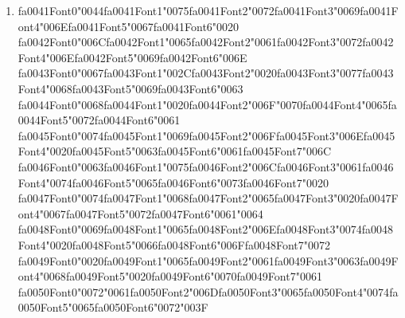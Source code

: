 \documentclass[11pt]{article}
\begin{document}
\begin{enumerate}[label=Q\arabic*., leftmargin=*]
\item {\csname fa0041Font0\endcsname\char"0044}{\csname fa0041Font1\endcsname\char"0075}{\csname fa0041Font2\endcsname\char"0072}{\csname fa0041Font3\endcsname\char"0069}{\csname fa0041Font4\endcsname\char"006E}{\csname fa0041Font5\endcsname\char"0067}{\csname fa0041Font6\endcsname\char"0020} {\csname fa0042Font0\endcsname\char"006C}{\csname fa0042Font1\endcsname\char"0065}{\csname fa0042Font2\endcsname\char"0061}{\csname fa0042Font3\endcsname\char"0072}{\csname fa0042Font4\endcsname\char"006E}{\csname fa0042Font5\endcsname\char"0069}{\csname fa0042Font6\endcsname\char"006E} {\csname fa0043Font0\endcsname\char"0067}{\csname fa0043Font1\endcsname\char"002C}{\csname fa0043Font2\endcsname\char"0020}{\csname fa0043Font3\endcsname\char"0077}{\csname fa0043Font4\endcsname\char"0068}{\csname fa0043Font5\endcsname\char"0069}{\csname fa0043Font6\endcsname\char"0063} {\csname fa0044Font0\endcsname\char"0068}{\csname fa0044Font1\endcsname\char"0020}{\csname fa0044Font2\endcsname\char"006F}{\char"0070}{\csname fa0044Font4\endcsname\char"0065}{\csname fa0044Font5\endcsname\char"0072}{\csname fa0044Font6\endcsname\char"0061} {\csname fa0045Font0\endcsname\char"0074}{\csname fa0045Font1\endcsname\char"0069}{\csname fa0045Font2\endcsname\char"006F}{\csname fa0045Font3\endcsname\char"006E}{\csname fa0045Font4\endcsname\char"0020}{\csname fa0045Font5\endcsname\char"0063}{\csname fa0045Font6\endcsname\char"0061}{\csname fa0045Font7\endcsname\char"006C} {\csname fa0046Font0\endcsname\char"0063}{\csname fa0046Font1\endcsname\char"0075}{\csname fa0046Font2\endcsname\char"006C}{\csname fa0046Font3\endcsname\char"0061}{\csname fa0046Font4\endcsname\char"0074}{\csname fa0046Font5\endcsname\char"0065}{\csname fa0046Font6\endcsname\char"0073}{\csname fa0046Font7\endcsname\char"0020} {\csname fa0047Font0\endcsname\char"0074}{\csname fa0047Font1\endcsname\char"0068}{\csname fa0047Font2\endcsname\char"0065}{\csname fa0047Font3\endcsname\char"0020}{\csname fa0047Font4\endcsname\char"0067}{\csname fa0047Font5\endcsname\char"0072}{\csname fa0047Font6\endcsname\char"0061}{\char"0064} {\csname fa0048Font0\endcsname\char"0069}{\csname fa0048Font1\endcsname\char"0065}{\csname fa0048Font2\endcsname\char"006E}{\csname fa0048Font3\endcsname\char"0074}{\csname fa0048Font4\endcsname\char"0020}{\csname fa0048Font5\endcsname\char"0066}{\csname fa0048Font6\endcsname\char"006F}{\csname fa0048Font7\endcsname\char"0072} {\csname fa0049Font0\endcsname\char"0020}{\csname fa0049Font1\endcsname\char"0065}{\csname fa0049Font2\endcsname\char"0061}{\csname fa0049Font3\endcsname\char"0063}{\csname fa0049Font4\endcsname\char"0068}{\csname fa0049Font5\endcsname\char"0020}{\csname fa0049Font6\endcsname\char"0070}{\csname fa0049Font7\endcsname\char"0061} {\csname fa0050Font0\endcsname\char"0072}{\char"0061}{\csname fa0050Font2\endcsname\char"006D}{\csname fa0050Font3\endcsname\char"0065}{\csname fa0050Font4\endcsname\char"0074}{\csname fa0050Font5\endcsname\char"0065}{\csname fa0050Font6\endcsname\char"0072}{\char"003F}\\

\end{enumerate}
\end{document}
